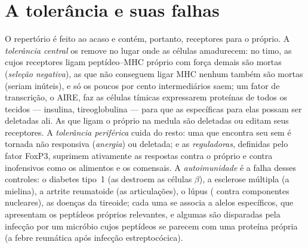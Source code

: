 \section{A tolerância e suas falhas}

\begin{definition}[Tolerância]\label{def:b3:adaptive-immunity:tolerance}
O repertório é feito ao acaso e contém, portanto, receptores para o
próprio. A \emph{tolerância central} os remove no lugar onde as células
amadurecem: no timo, as  cujos receptores ligam peptídeo--MHC
próprio com força demais são mortas (\emph{seleção negativa}), as que
não conseguem ligar MHC nenhum também são mortas (seriam inúteis), e só
os poucos por cento intermediários saem; um fator de transcrição, o
AIRE, faz as células tímicas expressarem proteínas de todos os tecidos
--- insulina, tireoglobulina --- para que as  específicas para
elas possam ser deletadas ali. As  que ligam o próprio na
medula são deletadas ou editam seus receptores. A \emph{tolerância
periférica} cuida do resto: uma  que encontra seu  sem
 é tornada não responsiva (\emph{anergia}) ou deletada; e
as  \emph{reguladoras}, definidas pelo fator FoxP3, suprimem
ativamente as respostas contra o próprio e contra  inofensivos
como os alimentos e os comensais. A \emph{autoimunidade} é a falha
desses controles: o diabetes tipo~1 (as  destroem as células
$\beta$), a esclerose múltipla (a mielina), a artrite reumatoide (as
articulações), o lúpus ( contra componentes nucleares), as
doenças da tireoide; cada uma se associa a alelos  específicos, que
apresentam os peptídeos próprios relevantes, e algumas são disparadas
pela infecção por um micróbio cujos peptídeos se parecem com uma
proteína própria (a febre reumática após infecção estreptocócica).
\end{definition}

